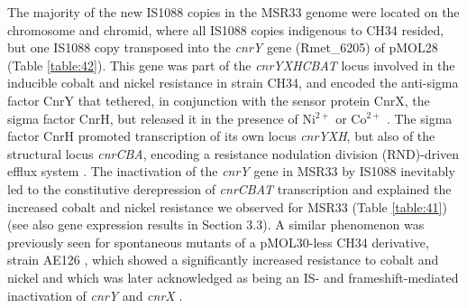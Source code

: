 The majority of the new IS1088 copies in the MSR33 genome were located on the chromosome and chromid, where all IS1088 copies indigenous to CH34 resided, but one IS1088 copy transposed into the \textit{cnrY} gene (Rmet\_6205) of pMOL28 (Table \ref{table:42}). This gene was part of the \textit{cnrYXHCBAT} locus involved in the inducible cobalt and nickel resistance in strain CH34, and encoded the anti-sigma factor CnrY that tethered, in conjunction with the sensor protein CnrX, the sigma factor CnrH, but released it in the presence of Ni$^{2+}$ or Co$^{2+}$ \citep{grass2000regulation, tibazarwa2000regulation}. The sigma factor CnrH promoted transcription of its own locus \textit{cnrYXH}, but also of the structural locus \textit{cnrCBA}, encoding a resistance nodulation division (RND)-driven efflux system \citep{janssen2010complete, kim2011switch}. The inactivation of the \textit{cnrY} gene in MSR33 by IS1088 inevitably led to the constitutive derepression of \textit{cnrCBAT} transcription and explained the increased cobalt and nickel resistance we observed for MSR33 (Table \ref{table:41}) (see also gene expression results in Section 3.3). A similar phenomenon was previously seen for spontaneous mutants of a pMOL30-less CH34 derivative, strain AE126 \citep{mergeay1985alcaligenes}, which showed a significantly increased resistance to cobalt and nickel \citep{collard1993new} and which was later acknowledged as being an IS- and frameshift-mediated inactivation of \textit{cnrY} and \textit{cnrX} \citep{vandecraen2016zinc}.
